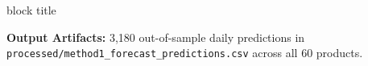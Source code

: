 \documentclass[aspectratio=169, 10pt]{beamer}
\newenvironment{highlightcard}[1][]{%
        \begin{beamercolorbox}[rounded=true,shadow=false,wd=\linewidth,sep=3.5pt,#1]{block title}%
        \fontsize{7.8pt}{9.8pt}\selectfont%
    }{%
        \end{beamercolorbox}%
    }
\begin{document}
\begin{frame}[t]
\begin{columns}[T]
        \end{columns}                                                                                                                                                                                  
        \vspace{0.15cm}                                                                                                                                                                                
        \begin{highlightcard}                                                                                                                                                                          
            \centering\scriptsize                                                                                                                                                                      
            \textbf{Output Artifacts:} 3,180 out-of-sample daily predictions in \texttt{processed/method1\_forecast\_predictions.csv} across all 60 products.                                          
        \end{highlightcard}                                                                                                                                                                            
    \end{frame}                                                                                                                                                                                        
                                                                                                                                                                                                       
\end{document}
